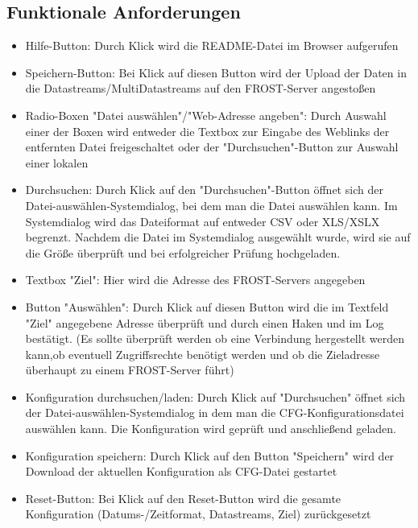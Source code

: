 \documentclass[12 pt]{article}
\begin{document}
\subsection{Funktionale Anforderungen}
\begin{itemize}

\item Hilfe-Button: Durch Klick wird die README-Datei im Browser aufgerufen
\item Speichern-Button: Bei Klick auf diesen Button wird der Upload der Daten in die Datastreams/MultiDatastreams auf den FROST-Server angestoßen

\item Radio-Boxen "Datei auswählen"/"Web-Adresse angeben": Durch Auswahl einer der Boxen wird entweder die Textbox zur Eingabe des Weblinks der entfernten Datei freigeschaltet oder der "Durchsuchen"-Button zur Auswahl einer lokalen
\item Durchsuchen: Durch Klick auf den "Durchsuchen"-Button öffnet sich der Datei-auswählen-Systemdialog, bei dem man die Datei auswählen kann. Im Systemdialog wird das Dateiformat auf entweder CSV oder XLS/XSLX begrenzt. Nachdem die Datei im Systemdialog ausgewählt wurde, wird sie auf die Größe überprüft und bei erfolgreicher Prüfung hochgeladen.

\item Textbox "Ziel": Hier wird die Adresse des FROST-Servers angegeben
\item Button "Auswählen": Durch Klick auf diesen Button wird die im Textfeld "Ziel" angegebene Adresse überprüft und durch einen Haken und im Log bestätigt. (Es sollte überprüft werden ob eine Verbindung hergestellt werden kann,ob eventuell Zugriffsrechte benötigt werden und ob die Zieladresse überhaupt zu einem FROST-Server führt) 

\item Konfiguration durchsuchen/laden: Durch Klick auf "Durchsuchen" öffnet sich der Datei-auswählen-Systemdialog in dem man die CFG-Konfigurationsdatei auswählen kann. Die Konfiguration wird geprüft und anschließend geladen.
\item Konfiguration speichern: Durch Klick auf den Button "Speichern" wird der Download der aktuellen Konfiguration als CFG-Datei gestartet
\item Reset-Button: Bei Klick auf den Reset-Button wird die gesamte Konfiguration (Datums-/Zeitformat, Datastreams, Ziel) zurückgesetzt


\end{itemize}
\end{document}

